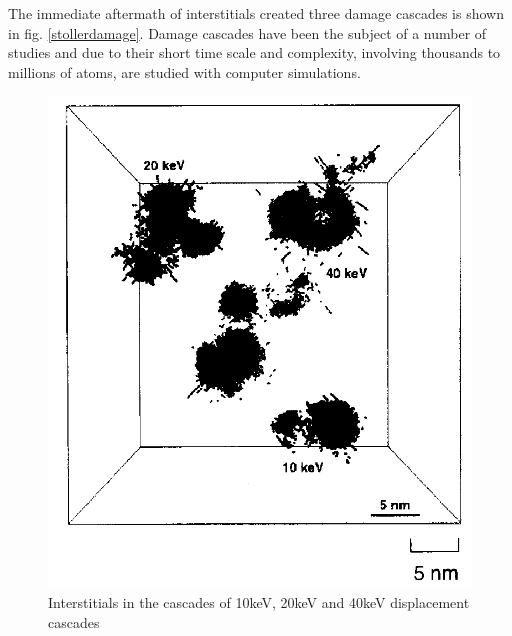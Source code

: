 The immediate aftermath of interstitials created three damage cascades is shown in fig. \ref{stollerdamage}.  Damage cascades have been the subject of a number of studies and due to their short time scale and complexity, involving thousands to millions of atoms, are studied with computer simulations.

\begin{figure}
  \begin{center}
    \includegraphics[width=.4\linewidth]{chapters/consequences_of_ionizing_radiation/images/stoller1996damage.png}
    \caption{Interstitials in the cascades of 10keV, 20keV and 40keV displacement cascades \cite{stollerdamage1996}}
    \label{fig:stollerdamage}
  \end{center}
\end{figure}



